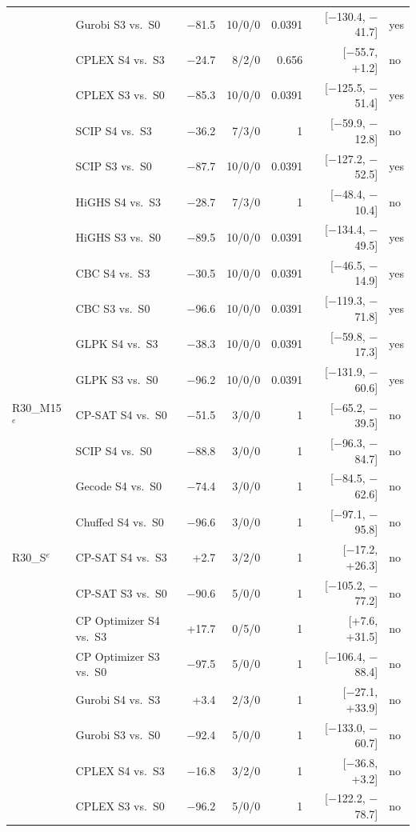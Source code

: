 \begin{longtable}{llrrrrl}
 & Gurobi S3 vs.\ S0 & $-$81.5 & 10/0/0 & 0.0391 & [$-$130.4, $-$41.7] & yes \\
 & CPLEX S4 vs.\ S3 & $-$24.7 & 8/2/0 & 0.656 & [$-$55.7, +1.2] & no \\
 & CPLEX S3 vs.\ S0 & $-$85.3 & 10/0/0 & 0.0391 & [$-$125.5, $-$51.4] & yes \\
 & SCIP S4 vs.\ S3 & $-$36.2 & 7/3/0 & 1 & [$-$59.9, $-$12.8] & no \\
 & SCIP S3 vs.\ S0 & $-$87.7 & 10/0/0 & 0.0391 & [$-$127.2, $-$52.5] & yes \\
 & HiGHS S4 vs.\ S3 & $-$28.7 & 7/3/0 & 1 & [$-$48.4, $-$10.4] & no \\
 & HiGHS S3 vs.\ S0 & $-$89.5 & 10/0/0 & 0.0391 & [$-$134.4, $-$49.5] & yes \\
 & CBC S4 vs.\ S3 & $-$30.5 & 10/0/0 & 0.0391 & [$-$46.5, $-$14.9] & yes \\
 & CBC S3 vs.\ S0 & $-$96.6 & 10/0/0 & 0.0391 & [$-$119.3, $-$71.8] & yes \\
 & GLPK S4 vs.\ S3 & $-$38.3 & 10/0/0 & 0.0391 & [$-$59.8, $-$17.3] & yes \\
 & GLPK S3 vs.\ S0 & $-$96.2 & 10/0/0 & 0.0391 & [$-$131.9, $-$60.6] & yes \\
R30\_M15$^{e}$ & CP-SAT S4 vs.\ S0 & $-$51.5 & 3/0/0 & 1 & [$-$65.2, $-$39.5] & no \\
 & SCIP S4 vs.\ S0 & $-$88.8 & 3/0/0 & 1 & [$-$96.3, $-$84.7] & no \\
 & Gecode S4 vs.\ S0 & $-$74.4 & 3/0/0 & 1 & [$-$84.5, $-$62.6] & no \\
 & Chuffed S4 vs.\ S0 & $-$96.6 & 3/0/0 & 1 & [$-$97.1, $-$95.8] & no \\
R30\_S$^{e}$ & CP-SAT S4 vs.\ S3 & +2.7 & 3/2/0 & 1 & [$-$17.2, +26.3] & no \\
 & CP-SAT S3 vs.\ S0 & $-$90.6 & 5/0/0 & 1 & [$-$105.2, $-$77.2] & no \\
 & CP Optimizer S4 vs.\ S3 & +17.7 & 0/5/0 & 1 & [+7.6, +31.5] & no \\
 & CP Optimizer S3 vs.\ S0 & $-$97.5 & 5/0/0 & 1 & [$-$106.4, $-$88.4] & no \\
 & Gurobi S4 vs.\ S3 & +3.4 & 2/3/0 & 1 & [$-$27.1, +33.9] & no \\
 & Gurobi S3 vs.\ S0 & $-$92.4 & 5/0/0 & 1 & [$-$133.0, $-$60.7] & no \\
 & CPLEX S4 vs.\ S3 & $-$16.8 & 3/2/0 & 1 & [$-$36.8, +3.2] & no \\
 & CPLEX S3 vs.\ S0 & $-$96.2 & 5/0/0 & 1 & [$-$122.2, $-$78.7] & no \\

\end{longtable}
